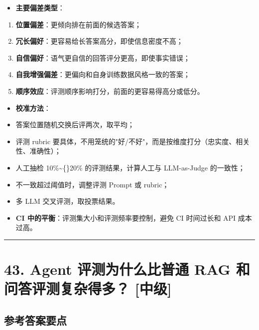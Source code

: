 \documentclass[9pt,a4paper,twocolumn]{ctexart}
\newcommand{\lvzhong}{\usebox{\badgezhongbox}}
\def\lvzhong{[中级]}%
\begin{document}
\begin{itemize}[itemsep=1pt, topsep=2pt]
  \item \textbf{主要偏差类型}：
\end{itemize}
\begin{enumerate}[itemsep=1pt, topsep=2pt]
  \item \textbf{位置偏差}：更倾向排在前面的候选答案；
  \item \textbf{冗长偏好}：更容易给长答案高分，即使信息密度不高；
  \item \textbf{自信偏好}：语气更自信的回答评分更高，即使事实错误；
  \item \textbf{自我增强偏差}：更偏向和自身训练数据风格一致的答案；
  \item \textbf{顺序效应}：评测顺序影响打分，前面的更容易得高分或低分。
\end{enumerate}
\begin{itemize}[itemsep=1pt, topsep=2pt]
  \item \textbf{校准方法}：
  \item 答案位置随机交换后评两次，取平均；
  \item 评测 rubric 要具体，不用笼统的"好/不好"，而是按维度打分（忠实度、相关性、准确性）；
  \item 人工抽检 10\%\textasciitilde\{\}20\% 的评测结果，计算人工与 LLM-as-Judge 的一致性；
  \item 不一致超过阈值时，调整评测 Prompt 或 rubric；
  \item 多 LLM 交叉评测，取投票结果。
  \item \textbf{CI 中的平衡}：评测集大小和评测频率要控制，避免 CI 时间过长和 API 成本过高。
\end{itemize}


\vspace{2pt}
\noindent\rule{\columnwidth}{0.3pt}\vspace{2pt}



\section*{43. Agent 评测为什么比普通 RAG 和问答评测复杂得多？ \lvzhong{}}


\subsection*{参考答案要点}
\end{document}
